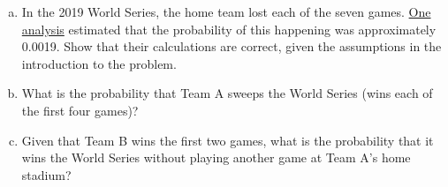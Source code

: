 \documentclass{article}
\begin{document}
\begin{enumerate}[(a)]
\item In the 2019 World Series, the home team lost each of the seven games. \href{https://www.theringer.com/mlb-playoffs/2019/10/31/20942186/nationals-astros-world-series-home-field-advantage-history}{One analysis} estimated that the probability of this happening was approximately 0.0019. Show that their calculations are correct, given the assumptions in the introduction to the problem.
\item What is the probability that Team A sweeps the World Series (wins each of the first four games)?
\item Given that Team B wins the first two games, what is the probability that it wins the World Series without playing another game at Team A's home stadium?

\end{enumerate} 
\end{document}
